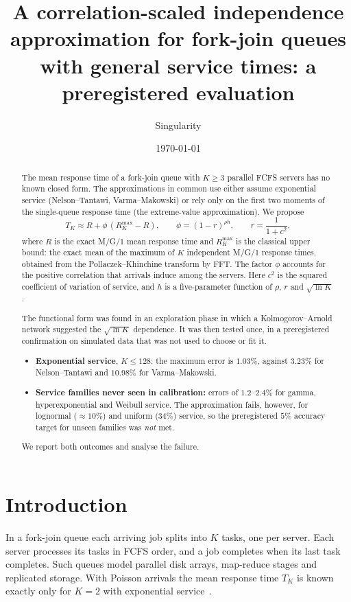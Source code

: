 \documentclass[11pt]{article}
\title{A correlation-scaled independence approximation for fork-join queues with general service times:
a preregistered evaluation}
\author{Singularity}
\date{\today}
\begin{document}
\maketitle

\begin{abstract}
The mean response time of a fork-join queue with $K\ge3$ parallel FCFS servers has no known closed form. The
approximations in common use either assume exponential service (Nelson--Tantawi, Varma--Makowski) or rely only on
the first two moments of the single-queue response time (the extreme-value approximation). We propose
\[
T_K\approx R+\phi\,(R^{\max}_K-R),\qquad \phi=(1-r)^{\rho h},\qquad r=\frac{1}{1+c^2},
\]
where $R$ is the exact M/G/1 mean response time and $R^{\max}_K$ is the classical upper bound: the exact mean of the
maximum of $K$ independent M/G/1 response times, obtained from the Pollaczek--Khinchine transform by FFT. The factor
$\phi$ accounts for the positive correlation that arrivals induce among the servers. Here $c^2$ is the squared
coefficient of variation of service, and $h$ is a five-parameter function of $\rho$, $r$ and $\sqrt{\ln K}$.

The functional form was found in an exploration phase in which a Kolmogorov--Arnold network suggested the
$\sqrt{\ln K}$ dependence. It was then tested once, in a preregistered confirmation on simulated data that was not
used to choose or fit it.
\begin{itemize}
\item \textbf{Exponential service}, $K\le128$: the maximum error is $1.03\%$, against $3.23\%$ for Nelson--Tantawi and
$10.98\%$ for Varma--Makowski.
\item \textbf{Service families never seen in calibration:} errors of $1.2$--$2.4\%$ for gamma, hyperexponential and
Weibull service. The approximation fails, however, for lognormal ($\approx10\%$) and uniform ($34\%$) service, so the
preregistered $5\%$ accuracy target for unseen families was \emph{not} met.
\end{itemize}
We report both outcomes and analyse the failure.
\end{abstract}

\section{Introduction}

In a fork-join queue each arriving job splits into $K$ tasks, one per server. Each server processes its tasks in
FCFS order, and a job completes when its last task completes. Such queues model parallel disk arrays, map-reduce
stages and replicated storage. With Poisson arrivals the mean response time $T_K$ is known exactly only for $K=2$ with
exponential service~\cite{FlattoHahn1984}.
\end{document}
